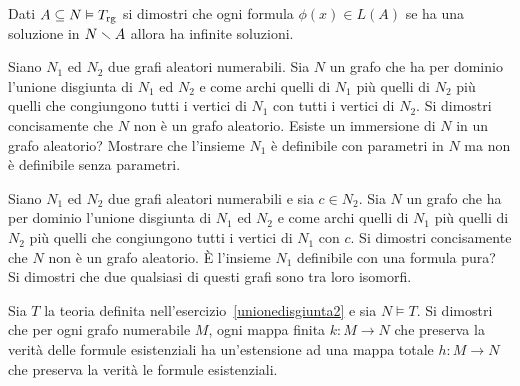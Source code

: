 \begin{exercise}\label{ex_grafo_aleatorio_no_finiti_definibili} Dati $A\subseteq N\models T_{\rm rg}$ si dimostri che ogni formula $\phi(x)\in L(A)$ se ha una soluzione in $N\sm A$ allora ha infinite soluzioni.\QED
\end{exercise}


\begin{exercise}\label{N1N2}
Siano $N_1$ ed $N_2$ due grafi aleatori numerabili. Sia $N$ un grafo che ha per dominio l'unione disgiunta di $N_1$ ed $N_2$ e come archi quelli di $N_1$ pi\`u quelli di $N_2$ pi\`u quelli che congiungono tutti i vertici di $N_1$ con tutti i vertici di $N_2$. Si dimostri concisamente che $N$ non \`e un grafo aleatorio. Esiste un immersione di $N$ in un grafo aleatorio? Mostrare che l'insieme $N_1$ \`e definibile con parametri in $N$ ma non \`e definibile senza parametri.\QED %
\end{exercise}


\begin{exercise}
Siano $N_1$ ed $N_2$ due grafi aleatori numerabili e sia $c\in N_2$. Sia $N$ un grafo che ha per dominio l'unione disgiunta di $N_1$ ed $N_2$ e come archi quelli di $N_1$ pi\`u quelli di $N_2$ pi\`u quelli che congiungono tutti i vertici di $N_1$ con $c$. Si dimostri concisamente che $N$ non \`e un grafo aleatorio. \`E l'insieme $N_1$ definibile con una formula pura? Si dimostri che due qualsiasi di questi grafi sono tra loro isomorfi.\QED
\end{exercise}


\begin{exercise}
Sia $T$ la teoria definita nell'esercizio~\ref{unionedisgiunta2} e sia $N\models T$. Si dimostri che per ogni grafo numerabile $M$, ogni mappa finita $k:M\to N$ che preserva la verit\`a delle formule esistenziali ha un'estensione ad una mappa totale $h:M\to N$ che preserva la verit\`a le formule esistenziali.\QED
\end{exercise}

